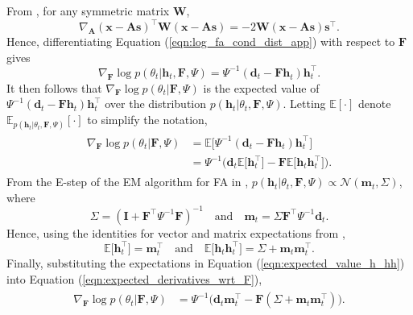 \documentclass[msc,deptreport.inf]{infthesis} %
\newcommand{\matr}[1]{\mathbf{#1}}
\newcommand{\E}{\mathbb E}
\begin{document}
From \cite{petersen2012}, for any symmetric matrix $\matr{W}$,
\begin{equation}
	\nabla_{\matr{A}} (\matr{x} - \matr{As})^\intercal \matr{W} (\matr{x} - \matr{As}) = -2 \matr{W} (\matr{x} - \matr{As}) \matr{s}^\intercal.
\end{equation}
Hence, differentiating Equation (\ref{eqn:log_fa_cond_dist_app}) with respect to $\matr{F}$ gives
\begin{equation}
	\nabla_{\matr{F}} \log p(\theta_t | \matr{h}_t, \matr{F}, \Psi)
	= \Psi^{-1} (\matr{d}_t - \matr{Fh}_t) \matr{h}_t^\intercal.
\end{equation}
It then follows that $\nabla_{\matr{F}} \log p(\theta_t | \matr{F}, \Psi)$ is the expected value of $\Psi^{-1} (\matr{d}_t - \matr{Fh}_t) \matr{h}_t^\intercal$ over the distribution $p(\matr{h}_t | \theta_t, \matr{F}, \Psi)$. Letting $\E[\cdot]$ denote $\E_{p(\matr{h}_t | \theta_t, \matr{F}, \Psi)}[\cdot]$ to simplify the notation, 
\begin{align}\label{eqn:expected_derivatives_wrt_F}
\begin{split}
	\nabla_{\matr{F}} \log p(\theta_t | \matr{F}, \Psi) 
	& = \E \big[ \Psi^{-1} (\matr{d}_t - \matr{Fh}_t) \matr{h}_t^\intercal \big] \\
	& = \Psi^{-1}\big( \matr{d}_t \E \big[ \matr{h}_t^\intercal \big] 
	- \matr{F}  \E \big[ \matr{h}_t \matr{h}_t^\intercal \big]\big).
\end{split}
\end{align} 
From the E-step of the EM algorithm for FA in \cite{barber2007}, $p(\matr{h}_t | \theta_t, \matr{F}, \Psi) \propto \mathcal{N}(\matr{m}_t, \Sigma)$, where
\begin{equation}
	\Sigma = (\matr{I} + \matr{F}^\intercal \Psi^{-1} \matr{F})^{-1}
	\quad \text{and} \quad \matr{m}_t = \Sigma \matr{F}^\intercal \Psi^{-1} \matr{d}_t.
\end{equation}
Hence, using the identities for vector and matrix expectations from \cite{petersen2012}, 
\begin{equation}\label{eqn:expected_value_h_hh}
	\E \big[ \matr{h}_t^\intercal \big] = \matr{m}_t^\intercal \quad \text{and} \quad \E \big[ \matr{h}_t \matr{h}_t^\intercal \big] = \Sigma + \matr{m}_t \matr{m}_t^\intercal.
\end{equation}
Finally, substituting the expectations in Equation (\ref{eqn:expected_value_h_hh}) into Equation (\ref{eqn:expected_derivatives_wrt_F}), 
\begin{align}
\begin{split}
	\nabla_{\matr{F}} \log p(\theta_t | \matr{F}, \Psi) 
	& = \Psi^{-1} \big(\matr{d}_t \matr{m}_t^\intercal - \matr{F}  (\Sigma + \matr{m}_t \matr{m}_t^\intercal)\big).
\end{split}
\end{align} 
\end{document}
